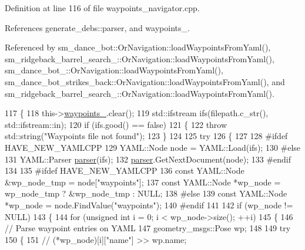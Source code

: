 Definition at line 116 of file waypoints\+\_\+navigator.\+cpp.



References generate\+\_\+debs\+::parser, and waypoints\+\_\+.



Referenced by sm\+\_\+dance\+\_\+bot\+::\+Or\+Navigation\+::load\+Waypoints\+From\+Yaml(), sm\+\_\+ridgeback\+\_\+barrel\+\_\+search\+\_\+::\+Or\+Navigation\+::load\+Waypoints\+From\+Yaml(), sm\+\_\+dance\+\_\+bot\+\_\+::\+Or\+Navigation\+::load\+Waypoints\+From\+Yaml(), sm\+\_\+dance\+\_\+bot\+\_\+strikes\+\_\+back\+::\+Or\+Navigation\+::load\+Waypoints\+From\+Yaml(), and sm\+\_\+ridgeback\+\_\+barrel\+\_\+search\+\_\+::\+Or\+Navigation\+::load\+Waypoints\+From\+Yaml().


\begin{DoxyCode}
117 \{
118   this->\hyperlink{classcl__move__base__z_1_1WaypointNavigator_a727f6a73e15ff5dc6bb3ffdf52c3d832}{waypoints\_}.clear();
119   std::ifstream ifs(filepath.c\_str(), std::ifstream::in);
120   \textcolor{keywordflow}{if} (ifs.good() == \textcolor{keyword}{false})
121   \{
122     \textcolor{keywordflow}{throw} std::string(\textcolor{stringliteral}{"Waypoints file not found"});
123   \}
124 
125   \textcolor{keywordflow}{try}
126   \{
127 
128 \textcolor{preprocessor}{#ifdef HAVE\_NEW\_YAMLCPP}
129     YAML::Node node = YAML::Load(ifs);
130 \textcolor{preprocessor}{#else}
131     YAML::Parser \hyperlink{namespacegenerate__debs_a4a9ae4bb85fc62d7973ea3d09ced6c26}{parser}(ifs);
132     \hyperlink{namespacegenerate__debs_a4a9ae4bb85fc62d7973ea3d09ced6c26}{parser}.GetNextDocument(node);
133 \textcolor{preprocessor}{#endif}
134 
135 \textcolor{preprocessor}{#ifdef HAVE\_NEW\_YAMLCPP}
136     \textcolor{keyword}{const} YAML::Node &wp\_node\_tmp = node[\textcolor{stringliteral}{"waypoints"}];
137     \textcolor{keyword}{const} YAML::Node *wp\_node = wp\_node\_tmp ? &wp\_node\_tmp : NULL;
138 \textcolor{preprocessor}{#else}
139     \textcolor{keyword}{const} YAML::Node *wp\_node = node.FindValue(\textcolor{stringliteral}{"waypoints"});
140 \textcolor{preprocessor}{#endif}
141 
142     \textcolor{keywordflow}{if} (wp\_node != NULL)
143     \{
144       \textcolor{keywordflow}{for} (\textcolor{keywordtype}{unsigned} \textcolor{keywordtype}{int} i = 0; i < wp\_node->size(); ++i)
145       \{
146         \textcolor{comment}{// Parse waypoint entries on YAML}
147         geometry\_msgs::Pose wp;
148 
149         \textcolor{keywordflow}{try}
150         \{
151           \textcolor{comment}{// (*wp\_node)[i]["name"] >> wp.name;}

\end{DoxyCode}
